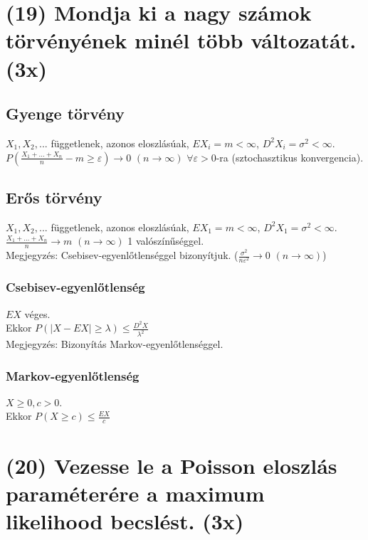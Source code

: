 \documentclass[12p]{article}
\begin{document}
\section{(19) Mondja ki a nagy számok törvényének minél több változatát. (3x)}

	\subsection{Gyenge törvény}
	
	$X_1, X_2, ...$ függetlenek, azonos eloszlásúak, $EX_i = m < \infty$, $D^{2}X_i = \sigma^2 < \infty$. \\
	$P(\frac{X_1 + ... + X_n}{n} - m \geq \varepsilon) \rightarrow 0$ $(n \to \infty)$ $\forall \varepsilon > 0$-ra (sztochasztikus konvergencia).
	
	\subsection{Erős törvény}
	
	$X_1, X_2, ...$ függetlenek, azonos eloszlásúak, $EX_1 = m < \infty$, $D^{2}X_1 = \sigma^2 < \infty$. \\
	$\frac{X_1 + ... + X_n}{n} \rightarrow m$ $(n \to \infty)$ 1 valószínűséggel. \\
	Megjegyzés: Csebisev-egyenlőtlenséggel bizonyítjuk. ($\frac{\sigma^2}{n \varepsilon^2} \to 0$ $(n \to \infty)$)
	
	\subsubsection{Csebisev-egyenlőtlenség}
	
	$EX$ véges. \\
	Ekkor $P(|X-EX| \geq \lambda) \leq \frac{D^{2}X}{\lambda^2}$ \\
	Megjegyzés: Bizonyítás Markov-egyenlőtlenséggel.
	
	\subsubsection{Markov-egyenlőtlenség}
	
	$X \geq 0, c > 0$. \\
	Ekkor $P(X \geq c) \leq \frac{EX}{c}$
	


\section{(20) Vezesse le a Poisson eloszlás paraméterére a maximum likelihood becslést. (3x)}
\end{document}
